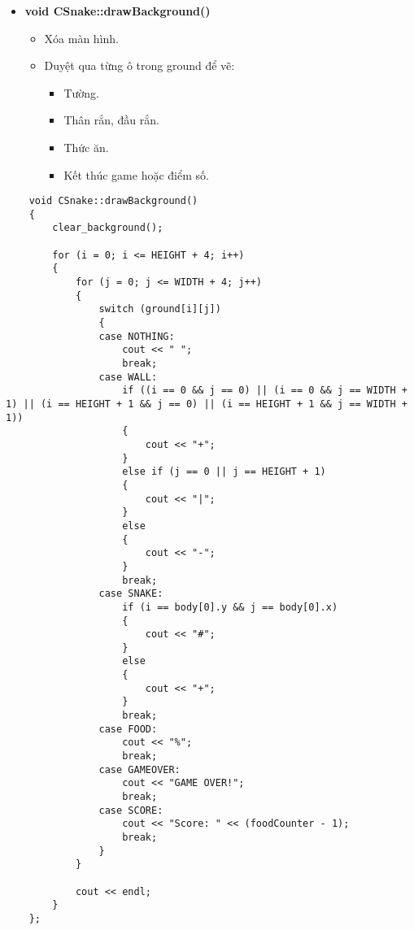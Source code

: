 \documentclass[a4paper, 12pt]{article}
\begin{document}
\begin{center}
    \begin{itemize}
        \item \textbf{void CSnake::drawBackground()}
        \begin{itemize}
            \item Xóa màn hình.
            \item Duyệt qua từng ô trong ground để vẽ:
            \begin{itemize}
                \item Tường.
                \item Thân rắn, đầu rắn.
                \item Thức ăn.
                \item Kết thúc game hoặc điểm số.
            \end{itemize}
        \end{itemize}
    \end{itemize}
    
    \begin{lstlisting}
    void CSnake::drawBackground()
    {
        clear_background();
    
        for (i = 0; i <= HEIGHT + 4; i++)
        {
            for (j = 0; j <= WIDTH + 4; j++)
            {
                switch (ground[i][j])
                {
                case NOTHING:
                    cout << " ";
                    break;
                case WALL:
                    if ((i == 0 && j == 0) || (i == 0 && j == WIDTH + 1) || (i == HEIGHT + 1 && j == 0) || (i == HEIGHT + 1 && j == WIDTH + 1))
                    {
                        cout << "+";
                    }
                    else if (j == 0 || j == HEIGHT + 1)
                    {
                        cout << "|";
                    }
                    else
                    {
                        cout << "-";
                    }
                    break;
                case SNAKE:
                    if (i == body[0].y && j == body[0].x)
                    {
                        cout << "#";
                    }
                    else
                    {
                        cout << "+";
                    }
                    break;
                case FOOD:
                    cout << "%";
                    break;
                case GAMEOVER:
                    cout << "GAME OVER!";
                    break;
                case SCORE:
                    cout << "Score: " << (foodCounter - 1);
                    break;
                }
            }
    
            cout << endl;
        }
    };
    \end{lstlisting}
\end{center}
\end{document}
